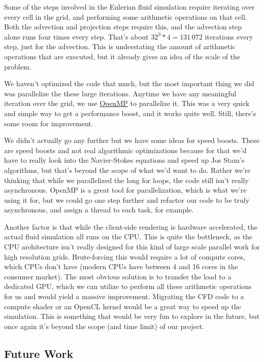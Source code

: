 \documentclass[a4paper,12pt,titlepage]{article}
\begin{document}
Some of the steps involved in the Eulerian fluid simulation require iterating
over every cell in the grid, and performing some arithmetic operations on that cell.
Both the advection and projection steps require this, and the advection step
alone runs four times every step. That's about $32^3 * 4 = 131\,072$ iterations
every step, just for the advection. This is understating the amount of arithmetic
operations that are executed, but it already gives an idea of the scale of the
problem.

We haven't optimized the code that much, but the most important thing we did was
parallelize the these large iterations. Anytime we have any meaningful iteration
over the grid, we use \href{www.openmp.org}{OpenMP} to parallelize it. This was
a very quick and simple way to get a performance boost, and it works quite well.
Still, there's some room for improvement.

We didn't actually go any further but we have some ideas for speed boosts. These
are speed boosts and not real algorithmic optimizations because for that we'd have
to really look into the Navier-Stokes equations and speed up Jos Stam's algorithms,
but that's beyond the scope of what we'd want to do. Rather we're thinking that
while we parallelized the long for loops, the code still isn't really asynchronous.
OpenMP is a great tool for parallelization, which is what we're using it for,
but we could go one step further and refactor our code to be truly asynchronous,
and assign a thread to each task, for example.

Another factor is that while the client-side rendering is hardware accelerated,
the actual fluid simulation all runs on the CPU. This is quite the bottleneck,
as the CPU architecture isn't really designed for this kind of large scale
parallel work for high resolution grids. Brute-forcing this would require a lot
of compute cores, which CPUs don't have (modern CPUs have between 4 and 16 cores
in the consumer market). The most obvious solution is to transfer the load to
a dedicated GPU, which we can utilize to perform all these arithmetic operations
for us and would yield a massive improvement. Migrating the CFD code to a compute
shader or an OpenCL kernel would be a great way to speed up the simulation. This
is something that would be very fun to explore in the future, but once again it's
beyond the scope (and time limit) of our project.

\subsection{Future Work}
\end{document}
